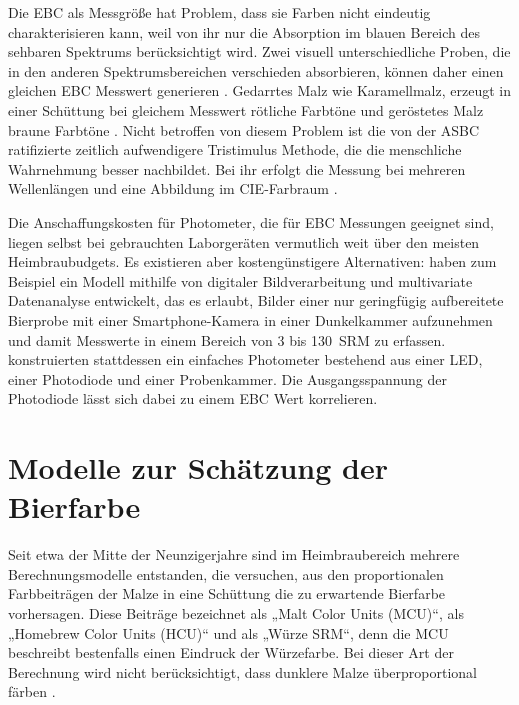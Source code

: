 \documentclass[a4paper,parskip=half]{scrartcl}
\begin{document}
Die EBC als Messgröße hat Problem, dass sie Farben nicht eindeutig charakterisieren kann, weil von ihr nur die Absorption im blauen Bereich des sehbaren Spektrums berücksichtigt wird. Zwei visuell unterschiedliche Proben, die in den anderen Spektrumsbereichen verschieden absorbieren, können daher einen gleichen EBC Messwert generieren \parencite{Shellhammer2009}. Gedarrtes Malz wie Karamellmalz, erzeugt in einer Schüttung bei gleichem Messwert rötliche Farbtöne und geröstetes Malz braune Farbtöne \parencites{Tucker2017}{Bies2020}. Nicht betroffen von diesem Problem ist die von der ASBC ratifizierte zeitlich aufwendigere Tristimulus Methode, die die menschliche Wahrnehmung besser nachbildet. Bei ihr erfolgt die Messung bei mehreren Wellenlängen und eine Abbildung im CIE-Farbraum \parencite{Shellhammer2009}.

Die Anschaffungskosten für Photometer, die für EBC Messungen geeignet sind, liegen selbst bei gebrauchten Laborgeräten vermutlich weit über den meisten Heimbraubudgets. Es existieren aber kostengünstigere Alternativen: \textcite{Fulgencio2019} haben zum Beispiel ein Modell mithilfe von digitaler Bildverarbeitung und multivariate Datenanalyse entwickelt, das es erlaubt, Bilder einer nur geringfügig aufbereitete Bierprobe mit einer Smartphone-Kamera in einer Dunkelkammer aufzunehmen und damit Messwerte in einem Bereich von 3 bis 130~SRM zu erfassen. \textcite{Caro2019} konstruierten stattdessen ein einfaches Photometer bestehend aus einer LED, einer Photodiode und einer Probenkammer. Die Ausgangsspannung der Photodiode lässt sich dabei zu einem EBC Wert korrelieren.

\section*{Modelle zur Schätzung der Bierfarbe}

Seit etwa der Mitte der Neunzigerjahre sind im Heimbraubereich mehrere Berechnungsmodelle entstanden, die versuchen, aus den proportionalen Farbbeiträgen der Malze in eine Schüttung die zu erwartende Bierfarbe vorhersagen. Diese Beiträge bezeichnet \textcite[61]{Daniels1996} als „Malt Color Units (MCU)“, \textcite[34]{Mosher1994} als „Homebrew Color Units (HCU)“  und \textcite[10]{Holle2010} als „Würze SRM“, denn die MCU beschreibt bestenfalls einen Eindruck der Würzefarbe. Bei dieser Art der Berechnung wird nicht berücksichtigt, dass dunklere Malze überproportional färben \parencite{KrausWeyermann2021c}.
\end{document}
